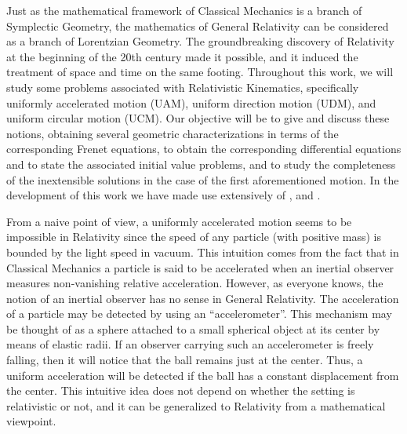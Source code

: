 \documentclass[11pt]{book}
\begin{document}
Just as the mathematical framework of Classical Mechanics is a branch of Symplectic Geometry, the mathematics of General Relativity can be considered as a branch of Lorentzian Geometry. The groundbreaking discovery of Relativity at the beginning of the 20th century made it possible, and it induced the treatment of space and time on the same footing. Throughout this work, we will study some problems associated with Relativistic Kinematics, specifically uniformly accelerated motion (UAM), uniform direction motion (UDM), and uniform circular motion (UCM). Our objective will be to give and discuss these notions, obtaining several geometric characterizations in terms of the corresponding Frenet equations, to obtain the corresponding differential equations and to state the associated initial value problems, and to study the completeness of the inextensible solutions in the case of the first aforementioned motion. In the development of this work we have made use extensively of \cite{UAM}, \cite{UDM} and \cite{UCM}. 


From a naive point of view, a uniformly accelerated motion seems to be impossible in Relativity since the speed of any particle (with positive mass) is bounded by the light speed in vacuum. This intuition comes from the fact that in Classical Mechanics a particle is said to be accelerated when an inertial observer measures non-vanishing relative acceleration. However, as everyone knows, the notion of an inertial observer has no sense in General Relativity. The acceleration of a particle may be detected by using an ``accelerometer''. This mechanism may be thought of as a sphere attached to a small spherical object at its center by means of elastic radii. If an observer carrying such an accelerometer is freely falling, then it will notice that the ball remains just at the center. Thus, a uniform acceleration will be detected if the ball has a constant displacement from the center. This intuitive idea does not depend on whether the setting is relativistic or not, and it can be generalized to Relativity from a mathematical viewpoint.
\end{document}
